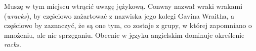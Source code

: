Muszę w tym miejscu wtrącić uwagę jężykową.
Conway nazwał wraki wrakami (\emph{wracks}), by częściowo zażartować z nazwiska jego kolegi Gavina Wraitha,
a częściowo by zaznaczyć, że są one tym, co zostaje z grupy, w której zapomniano o mnożeniu, ale nie sprzęganiu.
Obecnie w języku angielskim dominuje określenie \emph{racks}.

